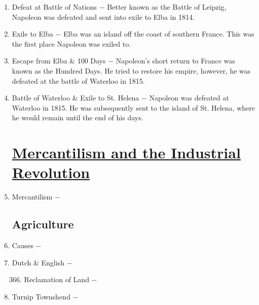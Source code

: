 \documentclass[12pt]{article}
\begin{document}
\begin{enumerate}
\begin{enumerate}[label=\arabic{*}.]
\end{enumerate}
\setcounter{enumi}{358}

\item Defeat at Battle of Nations $-$ Better known as the Battle of Leipzig, Napoleon was defeated and sent into exile to Elba in 1814.

\item Exile to Elba $-$ Elba was an island off the coast of southern France. This was the first place Napoleon was exiled to.

\item Escape from Elba \& 100 Days $-$ Napoleon's short return to France was known as the Hundred Days. He tried to restore his empire, however, he was defeated at the battle of Waterloo in 1815.

\item Battle of Waterloo \& Exile to St. Helena $-$ Napoleon was defeated at Waterloo in 1815. He was subsequently sent to the island of St. Helena, where he would remain until the end of his days.

\section[\underline{Mercantilism, Agricultural Revolution, \& Industrial Revolution}]{\underline{Mercantilism and the Industrial Revolution}}

\item Mercantilism $-$ 

\subsection{Agriculture}

\item Causes $-$ 

\item Dutch \& English $-$ 
 
\begin{enumerate}[label=\arabic{*}.]
\setcounter{enumii}{365}

\item Reclamation of Land $-$

\end{enumerate}
\setcounter{enumi}{366}

\item Turnip Townshend $-$ 

\begin{enumerate}[label=\arabic{*}.]
\setcounter{enumii}{367}


\end{enumerate}
\end{enumerate}
\end{document}
